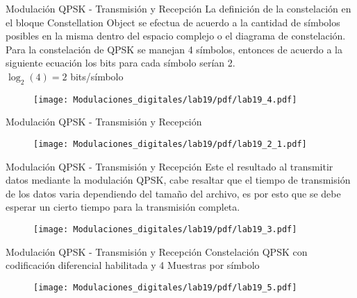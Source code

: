 
\begin{frame}{Modulación QPSK - Transmisión y Recepción}
	\justifying
	La definición de la constelación en el bloque Constellation Object se efectua de acuerdo a la cantidad de símbolos posibles en la misma dentro del espacio complejo o el diagrama de constelación. Para la constelación de QPSK se manejan 4 símbolos, entonces de acuerdo a la siguiente ecuación los bits para cada símbolo serían 2.\\
	\centering
	$\log_{2}(4)=2$ bits/símbolo\\
	\begin{figure}
		\texttt{[image: Modulaciones\_digitales/lab19/pdf/lab19\_4.pdf]}
	\end{figure}
\end{frame}


\begin{frame}{Modulación QPSK - Transmisión y Recepción}
	\begin{figure}
		\texttt{[image: Modulaciones\_digitales/lab19/pdf/lab19\_2\_1.pdf]}
	\end{figure}
\end{frame}

\begin{frame}{Modulación QPSK - Transmisión y Recepción}
	\justifying
	Este el resultado al transmitir datos mediante la modulación QPSK, cabe resaltar que el tiempo de transmisión de los datos varia dependiendo del tamaño del archivo, es por esto que se debe esperar un cierto tiempo para la transmisión completa. 
	\begin{figure}
		\texttt{[image: Modulaciones\_digitales/lab19/pdf/lab19\_3.pdf]}
	\end{figure}
\end{frame}
\begin{frame}{Modulación QPSK - Transmisión y Recepción}
\justifying
Constelación QPSK con codificación diferencial habilitada y 4 Muestras por símbolo
\begin{figure}
\texttt{[image: Modulaciones\_digitales/lab19/pdf/lab19\_5.pdf]}
\end{figure}
\end{frame}
